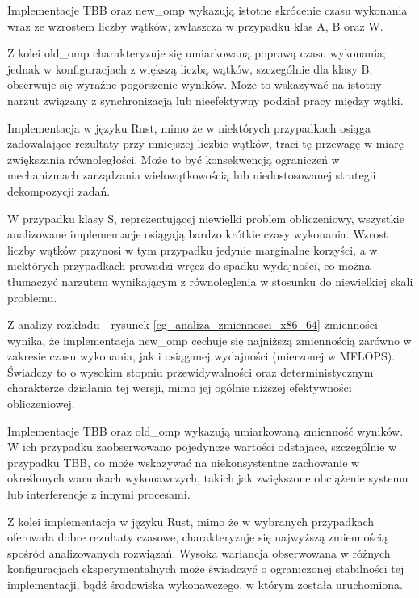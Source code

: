 Implementacje TBB oraz new\_omp wykazują istotne skrócenie czasu wykonania wraz ze wzrostem liczby wątków, zwłaszcza w przypadku klas A, B oraz W.

Z kolei old\_omp charakteryzuje się umiarkowaną poprawą czasu wykonania; jednak w konfiguracjach z większą liczbą wątków, szczególnie dla klasy B, obserwuje się wyraźne pogorszenie wyników. Może to wskazywać na istotny narzut związany z synchronizacją lub nieefektywny podział pracy między wątki.

Implementacja w języku Rust, mimo że w niektórych przypadkach osiąga zadowalające rezultaty przy mniejszej liczbie wątków, traci tę przewagę w miarę zwiększania równoległości. Może to być konsekwencją ograniczeń w mechanizmach zarządzania wielowątkowością lub niedostosowanej strategii dekompozycji zadań.

W przypadku klasy S, reprezentującej niewielki problem obliczeniowy, wszystkie analizowane implementacje osiągają bardzo krótkie czasy wykonania. Wzrost liczby wątków przynosi w tym przypadku jedynie marginalne korzyści, a w niektórych przypadkach prowadzi wręcz do spadku wydajności, co można tłumaczyć narzutem wynikającym z równoleglenia w stosunku do niewielkiej skali problemu.

Z analizy rozkładu - rysunek \ref{cg_analiza_zmiennosci_x86_64} zmienności wynika, że implementacja new\_omp cechuje się najniższą zmiennością zarówno w zakresie czasu wykonania, jak i osiąganej wydajności (mierzonej w MFLOPS). Świadczy to o wysokim stopniu przewidywalności oraz deterministycznym charakterze działania tej wersji, mimo jej ogólnie niższej efektywności obliczeniowej.

Implementacje TBB oraz old\_omp wykazują umiarkowaną zmienność wyników. W ich przypadku zaobserwowano pojedyncze wartości odstające, szczególnie w przypadku TBB, co może wskazywać na niekonsystentne zachowanie w określonych warunkach wykonawczych, takich jak zwiększone obciążenie systemu lub interferencje z innymi procesami.

Z kolei implementacja w języku Rust, mimo że w wybranych przypadkach oferowała dobre rezultaty czasowe, charakteryzuje się najwyższą zmiennością spośród analizowanych rozwiązań. Wysoka wariancja obserwowana w różnych konfiguracjach eksperymentalnych może świadczyć o ograniczonej stabilności tej implementacji, bądź środowiska wykonawczego, w którym została uruchomiona.

